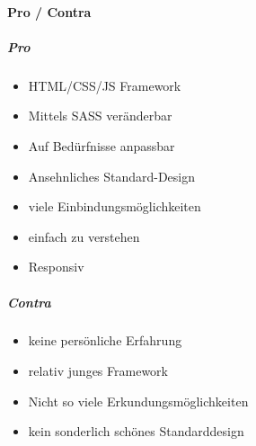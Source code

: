 		\paragraph{Pro / Contra}
		\subparagraph{Pro}
		\begin{itemize}
			\item HTML/CSS/JS Framework
			\item Mittels SASS veränderbar
			\item Auf Bedürfnisse anpassbar
			\item Ansehnliches Standard-Design 
			\item viele Einbindungsmöglichkeiten
			\item einfach zu verstehen
			\item Responsiv
		\end{itemize}
		\subparagraph{Contra}
		\begin{itemize}
			\item keine persönliche Erfahrung
			\item relativ junges Framework
			\item Nicht so viele Erkundungsmöglichkeiten
			\item kein sonderlich schönes Standarddesign
		\end{itemize}

